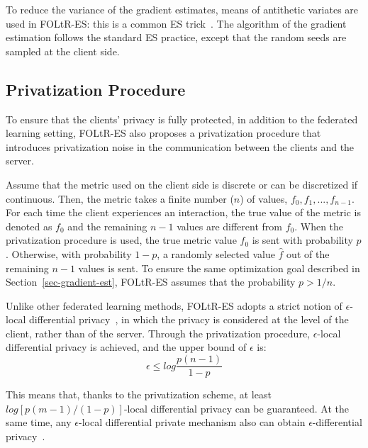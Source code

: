 To reduce the variance of the gradient estimates, means of antithetic variates are used in FOLtR-ES: this is a common ES trick~\cite{salimans2017evolution}. The algorithm of the gradient estimation follows the standard ES practice, except that the random seeds are sampled at the client side.

\subsection{Privatization Procedure}
To ensure that the clients' privacy is fully protected, in addition to the federated learning setting, FOLtR-ES also proposes a privatization procedure that introduces privatization noise in the communication between the clients and the server.

Assume that the metric used on the client side is discrete or can be discretized if continuous. Then, the metric takes a finite number ($n$) of values, $f_0, f_1, ..., f_{n-1}$. For each time the client experiences an interaction, the true value of the metric is denoted as $f_0$ and the remaining $n-1$ values are different from $f_0$. When the privatization procedure is used, the true metric value $f_0$ is sent with probability $p$. Otherwise, with probability $1-p$, a randomly selected value $\hat{f}$ out of the remaining $n-1$ values is sent. To ensure the same optimization goal described in Section~\ref{sec-gradient-est}, FOLtR-ES assumes that the probability $p > 1/n$.

Unlike other federated learning methods, FOLtR-ES adopts a strict notion of $\epsilon$-local differential privacy~\cite{kharitonov2019federated}, in which the privacy is considered at the level of the client, rather than of the server. Through the privatization procedure, $\epsilon$-local differential privacy is achieved, and the upper bound of $\epsilon$ is:
\begin{equation}
	\epsilon \leq log\frac{p(n-1)}{1-p} 
\end{equation}

This means that, thanks to the privatization scheme, at least $log[p(m-1)/(1-p)]$-local differential privacy can be guaranteed. At the same time, any $\epsilon$-local differential private mechanism also can obtain $\epsilon$-differential privacy~\cite{dwork2014algorithmic}.